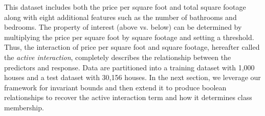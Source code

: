 \documentclass[ijds,nonblindrev]{informs-ijds}
\begin{document}

This dataset includes both the price per square foot and total square footage along with eight additional features such as the number of bathrooms and bedrooms.  The property of interest (above vs. below) can be determined by multiplying the price per square foot by square footage and setting a threshold.  Thus, the interaction of price per square foot and square footage, hereafter called the {\it active interaction}, completely describes the relationship between the predictors and response.  Data are partitioned into a training dataset with 1,000 houses and a test dataset with 30,156 houses.  In the next section, we leverage our framework for invariant bounds and then extend it to produce boolean relationships to recover the active interaction term and how it determines class membership.



\end{document}
